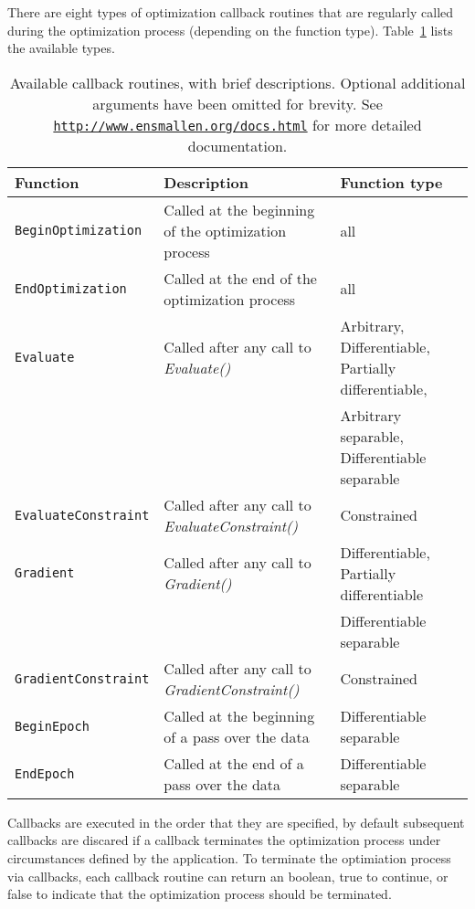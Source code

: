There are eight types of optimization callback routines that are regularly
called during the optimization process (depending on the function type).
Table~\ref{tab:callback_list} lists the available types.

\begin{table}[H]
\centering
\small
\begin{tabular}{lll}
\toprule
{\bf Function} & {\bf Description} & {\bf Function type} \\
\hline
\texttt{BeginOptimization}   & Called at the beginning of the optimization process  & all \\
\texttt{EndOptimization}     & Called at the end of the optimization process        & all \\
\texttt{Evaluate}            & Called after any call to {\it Evaluate()}            & Arbitrary, Differentiable, Partially differentiable,  \\
                             &                                                      & Arbitrary separable, Differentiable separable \\
\texttt{EvaluateConstraint}  & Called after any call to {\it EvaluateConstraint()}  & Constrained \\
\texttt{Gradient}            & Called after any call to {\it Gradient()}            & Differentiable, Partially differentiable \\
                             &                                                      & Differentiable separable \\
\texttt{GradientConstraint}  & Called after any call to {\it GradientConstraint()}  & Constrained \\
\texttt{BeginEpoch}          & Called at the beginning of a pass over the data      & Differentiable separable \\
\texttt{EndEpoch}            & Called at the end of a pass over the data            & Differentiable separable \\

\bottomrule
\end{tabular}
\vspace{0.5ex}
\caption
  {
  Available callback routines, with brief descriptions.
  Optional additional arguments have been omitted for brevity.
  See {\href{http://www.ensmallen.org/docs.html}{\mbox{\tt http://www.ensmallen.org/docs.html}}} for more detailed documentation.
  }
\label{tab:callback_list}
\end{table}

Callbacks are executed in the order that they are specified, by default
subsequent callbacks are discared if a callback terminates the optimization
process under circumstances defined by the application. To terminate the
optimiation process via callbacks, each callback routine can return an boolean,
true to continue, or false to indicate that the optimization process should be
terminated.

